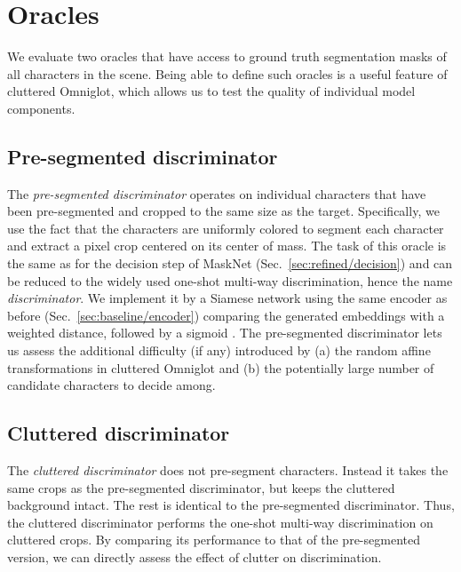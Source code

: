 \documentclass{article}
\begin{document}
\section{Oracles}
\label{sec:oracles}

We evaluate two oracles that have access to ground truth segmentation masks of all characters in the scene.
Being able to define such oracles is a useful feature of cluttered Omniglot, which allows us to test the quality of individual model components.



\subsection{Pre-segmented discriminator}

The {\it pre-segmented discriminator} operates on individual characters that have been pre-segmented and cropped to the same size as the target.
Specifically, we use the fact that the characters are uniformly colored to segment each character and extract a  pixel crop centered on its center of mass.
The task of this oracle is the same as for the decision step of MaskNet (Sec.~\ref{sec:refined/decision}) and can be reduced to the widely used one-shot multi-way discrimination, hence the name {\it discriminator}.
We implement it by a Siamese network using the same encoder as before (Sec.~\ref{sec:baseline/encoder}) comparing the generated embeddings with a weighted  distance, followed by a sigmoid \cite{Koch2015a}.
The pre-segmented discriminator lets us assess the additional difficulty (if any) introduced by (a) the random affine transformations in cluttered Omniglot and (b) the potentially large number of candidate characters to decide among.



\subsection{Cluttered discriminator}

The {\it cluttered discriminator} does not pre-segment characters.
Instead it takes the same crops as the pre-segmented discriminator, but keeps the cluttered background intact.
The rest is identical to the pre-segmented discriminator.
Thus, the cluttered discriminator performs the one-shot multi-way discrimination on cluttered crops.
By comparing its performance to that of the pre-segmented version, we can directly assess the effect of clutter on discrimination.
\end{document}
